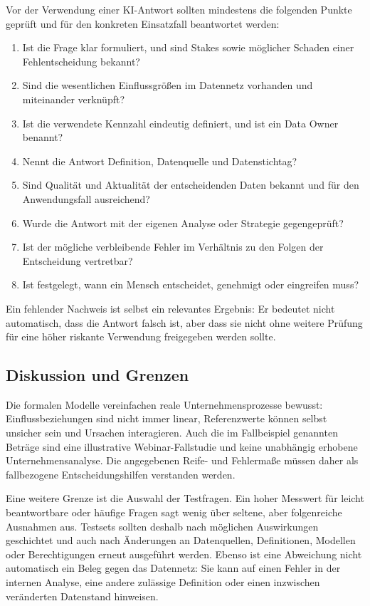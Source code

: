 \documentclass[a4paper,12pt]{article}
\theoremstyle{definition}
\begin{document}
Vor der Verwendung einer KI-Antwort sollten mindestens die folgenden Punkte geprüft und für den konkreten Einsatzfall beantwortet werden:
\begin{enumerate}[label=$\square$]
\item Ist die Frage klar formuliert, und sind Stakes sowie möglicher Schaden einer Fehlentscheidung bekannt?
\item Sind die wesentlichen Einflussgrößen im Datennetz vorhanden und miteinander verknüpft?
\item Ist die verwendete Kennzahl eindeutig definiert, und ist ein Data Owner benannt?
\item Nennt die Antwort Definition, Datenquelle und Datenstichtag?
\item Sind Qualität und Aktualität der entscheidenden Daten bekannt und für den Anwendungsfall ausreichend?
\item Wurde die Antwort mit der eigenen Analyse oder Strategie gegengeprüft?
\item Ist der mögliche verbleibende Fehler im Verhältnis zu den Folgen der Entscheidung vertretbar?
\item Ist festgelegt, wann ein Mensch entscheidet, genehmigt oder eingreifen muss?
\end{enumerate}
Ein fehlender Nachweis ist selbst ein relevantes Ergebnis: Er bedeutet nicht automatisch, dass die Antwort falsch ist, aber dass sie nicht ohne weitere Prüfung für eine höher riskante Verwendung freigegeben werden sollte.

\subsection{Diskussion und Grenzen}\label{sec:discussion}
Die formalen Modelle vereinfachen reale Unternehmensprozesse bewusst: Einflussbeziehungen sind nicht immer linear, Referenzwerte können selbst unsicher sein und Ursachen interagieren. Auch die im Fallbeispiel genannten Beträge sind eine illustrative Webinar-Fallstudie und keine unabhängig erhobene Unternehmensanalyse. Die angegebenen Reife- und Fehlermaße müssen daher als fallbezogene Entscheidungshilfen verstanden werden.

Eine weitere Grenze ist die Auswahl der Testfragen. Ein hoher Messwert für leicht beantwortbare oder häufige Fragen sagt wenig über seltene, aber folgenreiche Ausnahmen aus. Testsets sollten deshalb nach möglichen Auswirkungen geschichtet und auch nach Änderungen an Datenquellen, Definitionen, Modellen oder Berechtigungen erneut ausgeführt werden. Ebenso ist eine Abweichung nicht automatisch ein Beleg gegen das Datennetz: Sie kann auf einen Fehler in der internen Analyse, eine andere zulässige Definition oder einen inzwischen veränderten Datenstand hinweisen.
\end{document}
